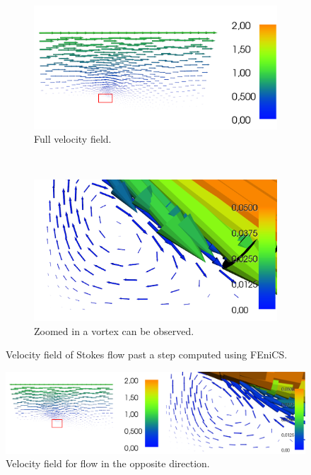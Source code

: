 \documentclass[11pt,a4paper,english]{article}
\numberwithin{equation}{section}
\begin{document}
\begin{figure}[t!]
    \centering
    \begin{subfigure}[b]{0.5\textwidth}
        \centering
        \includegraphics[scale=0.25]{vel_step1.png}
        \caption{Full velocity field.}
    \end{subfigure}%
    ~ 
    \begin{subfigure}[b]{0.5\textwidth} 
        \centering
        \includegraphics[scale=0.18]{vel_step2.png}
        \caption{Zoomed in a vortex can be observed.}
    \end{subfigure}
    \caption{Velocity field of Stokes flow past a step computed using FEniCS.}
\end{figure}


\vspace{1.5cm}
\begin{figure}[h!]
\begin{center}
  \includegraphics[scale=0.28]{reverse_velstep.png}
  \end{center}
  \caption{Velocity field for flow in the opposite direction.}
\end{figure}
\end{document}
